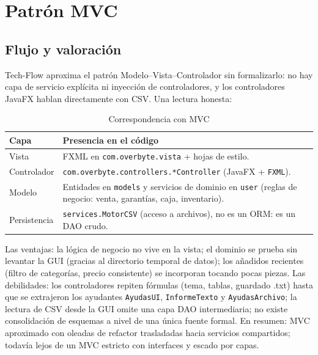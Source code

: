 \chapter{Patrón MVC}

\section{Flujo y valoración}
Tech-Flow aproxima el patrón Modelo–Vista–Controlador sin formalizarlo: no hay capa de servicio explícita ni inyección de controladores, y los controladores JavaFX hablan directamente con CSV. Una lectura honesta:

\begin{table}[H]\centering\caption{Correspondencia con MVC}\begin{tabular}{p{}p{}}\toprule
Capa & Presencia en el código\\\midrule
Vista & FXML en \texttt{com.overbyte.vista} + hojas de estilo.\\
Controlador & \texttt{com.overbyte.controllers.*Controller} (JavaFX + \texttt{FXML}).\\
Modelo & Entidades en \texttt{models} y servicios de dominio en \texttt{user} (reglas de negocio: venta, garantías, caja, inventario).\\
Persistencia & \texttt{services.MotorCSV} (acceso a archivos), no es un ORM: es un DAO crudo.\\\bottomrule\end{tabular}\end{table}

Las ventajas: la lógica de negocio no vive en la vista; el dominio se prueba sin levantar la GUI (gracias al directorio temporal de datos); los añadidos recientes (filtro de categorías, precio consistente) se incorporan tocando pocas piezas. Las debilidades: los controladores repiten fórmulas (tema, tablas, guardado .txt) hasta que se extrajeron los ayudantes \texttt{AyudasUI}, \texttt{InformeTexto} y \texttt{AyudasArchivo}; la lectura de CSV desde la GUI omite una capa DAO intermediaria; no existe consolidación de esquemas a nivel de una única fuente formal. En resumen: MVC aproximado con oleadas de refactor trasladadas hacia servicios compartidos; todavía lejos de un MVC estricto con interfaces y escado por capas.
